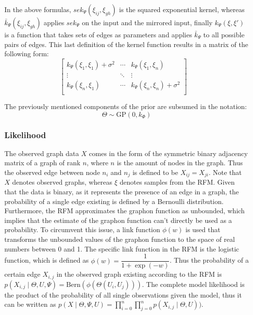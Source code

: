 \documentclass[11pt]{report} %
\begin{document}
In the above formulas, $sek_\Psi(\xi_{ij}, \xi_{gh})$ is the squared exponential kernel, whereas $\bar{k}_\Psi(\xi_{ij}, \xi_{gh})$ applies $sek_\Psi$ on the input and the mirrored input, finally $k_\Psi(\xi, \xi')$ is a function that takes sets of edges as parameters and applies $\bar{k}_\Psi$ to all possible pairs of edges. This last definition of the kernel function results in a matrix of the following form: 
        $$
	\begin{bmatrix} 
	k_\Psi(\xi_1, \xi_1) +\sigma^2 & \cdots & k_\Psi(\xi_1, \xi_n) \\
	\vdots &  \ddots & \vdots \\
	k_\Psi(\xi_n, \xi_1) & \cdots & k_\Psi(\xi_n, \xi_n) +\sigma^2 \\
	\end{bmatrix}
	\quad
	$$

The previously mentioned components of the prior are subsumed in the notation: $$\Theta \sim \text{GP}(0,k_{\Phi})$$
\subsubsection{Likelihood}
The observed graph data $X$ comes in the form of the symmetric binary adjacency matrix of a graph of rank $n$, where $n$ is the amount of nodes in the graph. Thus the observed edge between node $n_i$ and $n_j$ is defined to be $X_{ij} = X_{ji}$. Note that $X$ denotes observed graphs, whereas $\xi$ denotes samples from the RFM. Given that the data is binary, as it represents the presence of an edge in a graph, the probability of a single edge existing is defined by a Bernoulli distribution. Furthermore, the RFM approximates the graphon function as unbounded, which implies that the estimate of the graphon function can't directly be used as a probability. To circumvent this issue, a link function $\phi(w)$ is used that transforms the unbounded values of the graphon function to the space of real numbers between 0 and 1. The specific link function in the RFM is the logistic function, which is defined as $\phi(w) = \dfrac{1}{1+\exp{(-w)}}$. 
Thus the probability of a certain edge $X_{i,j}$ in the observed graph existing according to the RFM is $p(X_{i,j}\mid \Theta, U, \Psi) = \text{Bern}(\phi(\Theta(U_i, U_j)))$. The complete model likelihood is the product of the probability of all single observations given the model, thus it can be written as $p(X\mid\Theta,\Psi,U) = \prod_{i=0}^n \prod_{j=0}^n p(X_{i,j}\mid\Theta,U))$.
\end{document}
